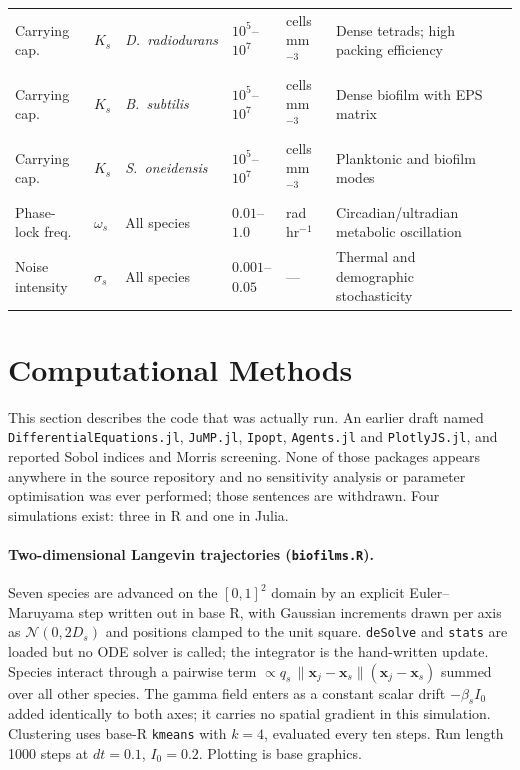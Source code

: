 \documentclass[11pt]{article}
\begin{document}
\begin{landscape}
\begin{table}[htbp]
{\begin{tabular}{@{}p{2.1cm}lp{3.0cm}p{3.0cm}lp{5.2cm}c@{}}
Carrying cap. & $K_s$ & \textit{D.\ radiodurans}   & $10^5$--$10^7$ & cells mm$^{-3}$ & Dense tetrads; high packing efficiency & \cite{slade2011} \\
Carrying cap. & $K_s$ & \textit{B.\ subtilis}      & $10^5$--$10^7$ & cells mm$^{-3}$ & Dense biofilm with EPS matrix & \cite{guttenplan2013} \\
Carrying cap. & $K_s$ & \textit{S.\ oneidensis}    & $10^5$--$10^7$ & cells mm$^{-3}$ & Planktonic and biofilm modes & \cite{heidelberg2002} \\
\midrule
Phase-lock freq. & $\omega_s$ & All species & $0.01$--$1.0$   & rad hr$^{-1}$ & Circadian/ultradian metabolic oscillation & \cite{kuramoto1984,acebron2005} \\
Noise intensity  & $\sigma_s$ & All species & $0.001$--$0.05$ & ---           & Thermal and demographic stochasticity & \cite{campillo2017} \\
\bottomrule
\end{tabular}}
\end{table}
\end{landscape}

\section{Computational Methods}
\label{sec:methods}

This section describes the code that was actually run. An earlier draft named
\texttt{DifferentialEquations.jl}, \texttt{JuMP.jl}, \texttt{Ipopt}, \texttt{Agents.jl} and
\texttt{PlotlyJS.jl}, and reported Sobol indices and Morris screening. None of those packages
appears anywhere in the source repository and no sensitivity analysis or parameter optimisation was
ever performed; those sentences are withdrawn. Four simulations exist: three in R and one in Julia.

\paragraph{Two-dimensional Langevin trajectories (\texttt{biofilms.R}).}
Seven species are advanced on the $[0,1]^2$ domain by an explicit Euler--Maruyama step written out
in base R, with Gaussian increments drawn per axis as $\mathcal{N}(0, 2D_s)$ and positions clamped
to the unit square. \texttt{deSolve} and \texttt{stats} are loaded but no ODE solver is called; the
integrator is the hand-written update. Species interact through a pairwise term
$\propto q_s\,\|\mathbf{x}_j - \mathbf{x}_s\|(\mathbf{x}_j - \mathbf{x}_s)$ summed over all other
species. The gamma field enters as a constant scalar drift $-\beta_s I_0$ added identically to both
axes; it carries no spatial gradient in this simulation. Clustering uses base-R \texttt{kmeans}
with $k = 4$, evaluated every ten steps. Run length 1000 steps at $dt = 0.1$, $I_0 = 0.2$. Plotting
is base graphics.
\end{document}
